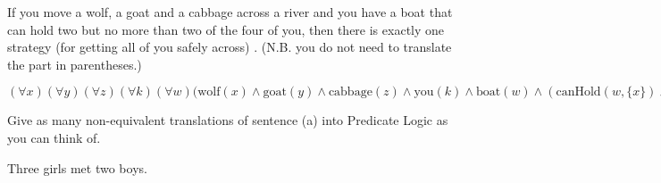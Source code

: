 \begin{QandA}
\begin{QandA}
		\item If you move a wolf, a goat and a cabbage across a river and you have a boat that can hold two but no more than two of the four of you, then there is exactly one strategy (for getting all of you safely across) .
		(N.B. you do not need to translate the part in parentheses.)
		\begin{answered}
			$(\forall x)(\forall y)(\forall z)(\forall k)(\forall w)(\text{wolf}(x) \land \text{goat}(y) \land \text{cabbage}(z) \land 
			\text{you}(k) \land \text{boat}(w) \land (\text{canHold}(w,\lbrace x \rbrace) \land \text{canHold}(w,\lbrace y \rbrace) \land \text{canHold}(w,\lbrace z \rbrace)
			\land \text{canHold}(w,\lbrace k \rbrace) \land \text{canHold}(w,\lbrace x,y \rbrace) \land \text{canHold}(w,\lbrace x,z \rbrace) \land \text{canHold}(w,\lbrace x,k \rbrace) \land
			\text{canHold}(w,\lbrace y,z \rbrace) \land \text{canHold}(w,\lbrace y,k \rbrace) \land \text{canHold}(w,\lbrace z,k \rbrace) \land \neg \text{canHold}(w,\lbrace x,y,z \rbrace) \land 
			\neg \text{canHold}(w,\lbrace x,y,k \rbrace) \land \neg \text{canHold}(w,\lbrace x,z,k \rbrace) \land \neg \text{canHold}(w,\lbrace y,z,k \rbrace) \land \neg \text{canHold}(w,\lbrace x,y,z,k \rbrace) \land \text{moveAcrossRiver}(x) \land \text{moveAcrossRiver}(y)
			\land \text{moveAcrossRiver}(z) \land \text{moveAcrossRiver}(k)) \rightarrow 
			(\exists x)(\text{strategy}(x) \land \text{True}(x)) \land (\forall y)((\text{strategy}(y) \land y \ne x) \rightarrow (\neg \text{True}(y)))$
		\end{answered}
	\end{QandA}
	\item Give as many non-equivalent translations of sentence (a) into Predicate Logic as you can think of.
	\begin{QandA}
		\item Three girls met two boys.
		\begin{answered}
\end{answered}
\end{QandA}
\end{QandA}
